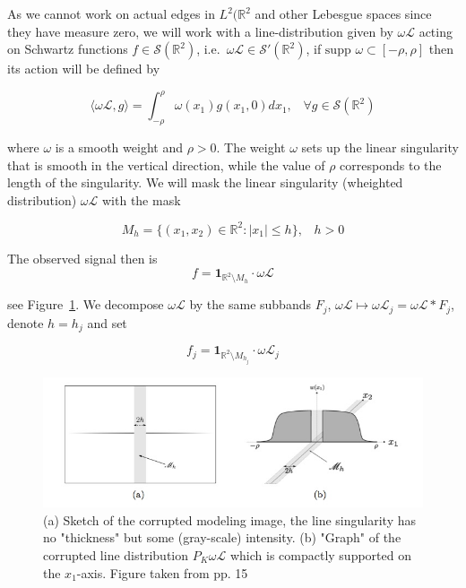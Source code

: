 \bigskip

As we cannot work on actual edges in $L^2(\mathbb{R}^2$ and other Lebesgue spaces since they have measure zero, we will work with a line-distribution given by $\omega\mathcal{L}$ acting on Schwartz functions $f\in\mathcal{S}(\mathbb{R}^2)$, i.e.\ $\omega\mathcal{L}\in \mathcal{S}'(\mathbb{R}^2)$, if $\text{supp }\omega\subset[-\rho,\rho]$ then its action will be defined by

$$
\langle \omega \mathcal{L},g\rangle = \int_{-\rho}^{\rho} \omega(x_1)g(x_1,0)dx_1 \textrm{,}\quad \forall g\in\mathcal{S}(\mathbb{R}^2)
$$

where $\omega$ is a smooth weight and $\rho>0$. The weight $\omega$ sets up the linear singularity that is smooth in the vertical direction, while the value of $\rho$ corresponds to the length of the singularity. We will mask the linear singularity (wheighted distribution) $\omega\mathcal{L}$ with the mask 

$$
M_h=\{(x_1,x_2)\in\mathbb{R}^2:|x_1|\leq h\}\textrm{,}\quad h>0
$$

The observed signal then is 
$$
f=\mathbf{1}_{\mathbb{R}^2\setminus M_h}\cdot \omega\mathcal{L}
$$ 

see Figure~\ref{fig:alpha6}. We decompose $\omega\mathcal{L}$ by the same subbands $F_j$, $\omega\mathcal{L}\mapsto \omega\mathcal{L}_j=\omega\mathcal{L}*F_j$, denote $h=h_j$ and set 

$$
f_j=\mathbf{1}_{\mathbb{R}^2\setminus M_{h_j}}\cdot \omega\mathcal{L}_j
$$

\begin{figure}[h!]
\centering
\includegraphics[width = 0.9 \textwidth]{./Diagrams/alpha6.jpg}
\caption{(a) Sketch of the corrupted modeling image, the line singularity has no "thickness" but some (gray-scale) intensity. (b) "Graph" of the corrupted line distribution $P_K\omega\mathcal{L}$ which is compactly supported on the $x_1$-axis. Figure taken from \cite{Gitta-alpha} pp. 15}
\label{fig:alpha6}
\end{figure}

\bigskip

